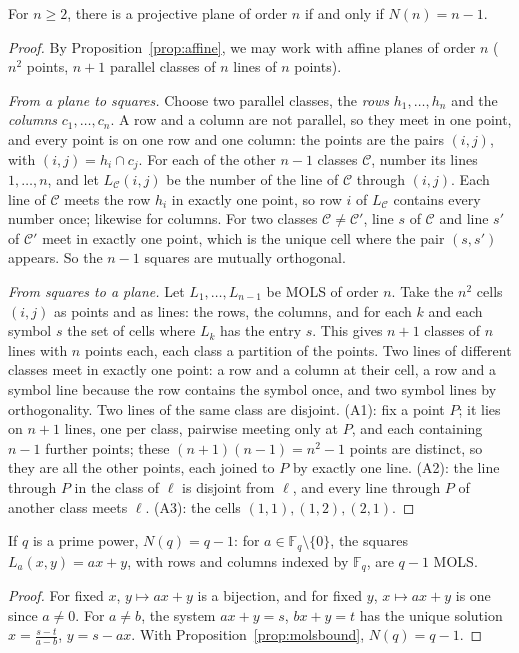 \begin{theorem}[Bose, 1938]\label{thm:planemols}
For $n\ge2$, there is a projective plane of order $n$ if and only if $N(n)=n-1$.
\end{theorem}
\begin{proof}
By Proposition~\ref{prop:affine}, we may work with affine planes of order $n$ ($n^2$ points, $n+1$ parallel classes of $n$ lines of $n$ points).

\emph{From a plane to squares.} Choose two parallel classes, the \emph{rows} $h_1,\dots,h_n$ and the \emph{columns} $c_1,\dots,c_n$. A row and a column are not parallel, so they meet in one
point, and every point is on one row and one column: the points are the pairs $(i,j)$, with $(i,j)=h_i\cap c_j$. For each of the other $n-1$ classes $\mathcal C$, number its lines $1,\dots,n$, and
let $L_{\mathcal C}(i,j)$ be the number of the line of $\mathcal C$ through $(i,j)$. Each line of $\mathcal C$ meets the row $h_i$ in exactly one point, so row $i$ of $L_{\mathcal C}$ contains every number
once; likewise for columns. For two classes $\mathcal C\ne\mathcal C'$, line $s$ of $\mathcal C$ and line $s'$ of $\mathcal C'$ meet in exactly one point, which is the unique cell where the pair $(s,s')$
appears. So the $n-1$ squares are mutually orthogonal.

\emph{From squares to a plane.} Let $L_1,\dots,L_{n-1}$ be MOLS of order $n$. Take the $n^2$ cells $(i,j)$ as points and as lines: the rows, the columns, and for each $k$ and each symbol $s$ the
set of cells where $L_k$ has the entry $s$. This gives $n+1$ classes of $n$ lines with $n$ points each, each class a partition of the points. Two lines of different classes meet in exactly one
point: a row and a column at their cell, a row and a symbol line because the row contains the symbol once, and two symbol lines by orthogonality. Two lines of the same class are disjoint. (A1):
fix a point $P$; it lies on $n+1$ lines, one per class, pairwise meeting only at $P$, and each containing $n-1$ further points; these $(n+1)(n-1)=n^2-1$ points are distinct, so they are all the other
points, each joined to $P$ by exactly one line. (A2): the line through $P$ in the class of $\ell$ is disjoint from $\ell$, and every line through $P$ of another class meets $\ell$. (A3): the cells
$(1,1),(1,2),(2,1)$.
\end{proof}

\begin{corollary}\label{cor:pmols}
If $q$ is a prime power, $N(q)=q-1$: for $a\in\mathbb F_q\setminus\{0\}$, the squares $L_a(x,y)=ax+y$, with rows and columns indexed by $\mathbb F_q$, are $q-1$ MOLS.
\end{corollary}
\begin{proof}
For fixed $x$, $y\mapsto ax+y$ is a bijection, and for fixed $y$, $x\mapsto ax+y$ is one since $a\ne0$. For $a\ne b$, the system $ax+y=s$, $bx+y=t$ has the unique solution $x=\frac{s-t}{a-b}$,
$y=s-ax$. With Proposition~\ref{prop:molsbound}, $N(q)=q-1$.
\end{proof}

